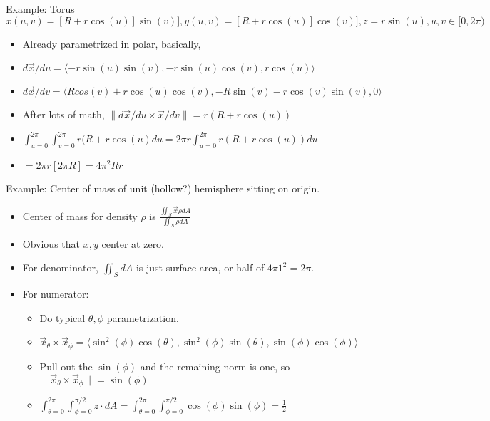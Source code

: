 \documentclass[11pt, oneside]{article}   	%
\begin{document}
Example: Torus $x(u,v) = [R+r\cos(u)]\sin(v)], y(u,v) = [R+r\cos(u)]\cos(v)], z = r \sin(u), u, v \in [0, 2\pi)$
\begin{itemize}
\item Already parametrized in polar, basically,
\item $d\vec{x}/du = \langle -r \sin (u) \sin (v),  -r \sin (u) \cos (v), r \cos (u)\rangle$
\item $d\vec{x}/dv = \langle Rcos(v) + r\cos(u)\cos(v), -R\sin(v) -r\cos(v)\sin(v), 0\rangle$
\item After lots of math, $\| d\vec{x}/du \times \vec{x}/dv \| = r(R+ r\cos(u))$
\item $\int_{u = 0}^{2\pi} \int_{v = 0}^{2 \pi}  r(R+ r\cos(u)du = 2 \pi r \int_{u = 0}^{2\pi}r(R+ r\cos(u))du$
\item $= 2\pi r [2 \pi R] = 4 \pi^2 R r$
\end{itemize}


Example: Center of mass of unit (hollow?) hemisphere sitting on origin.
\begin{itemize}
\item Center of mass for density $\rho$ is $\frac{\iint_S \vec{x} \rho dA}{\iint_S \rho dA}$
\item Obvious that $x, y$ center at zero.
\item For denominator, $\iint_S dA$ is just surface area, or half of $4 \pi 1^2 = 2 \pi$.
\item For numerator:
\begin{itemize}
\item Do typical $\theta, \phi$ parametrization.
\item $\vec{x}_{\theta} \times \vec{x}_{\phi} = \langle \sin^2(\phi) \cos(\theta), \sin^2(\phi)\sin(\theta), \sin(\phi)\cos(\phi) \rangle$
\item Pull out the $\sin(\phi)$ and the remaining norm is one, so $\| \vec{x}_{\theta} \times \vec{x}_{\phi}\| = \sin(\phi)$ 
\item $\int_{\theta = 0}^{2\pi} \int_{\phi = 0}^{\pi / 2} z \cdot dA = \int_{\theta = 0}^{2\pi} \int_{\phi = 0}^{\pi / 2} \cos(\phi)\sin(\phi) = \frac{1}{2}$
\end{itemize}

\end{itemize}
\end{document}
